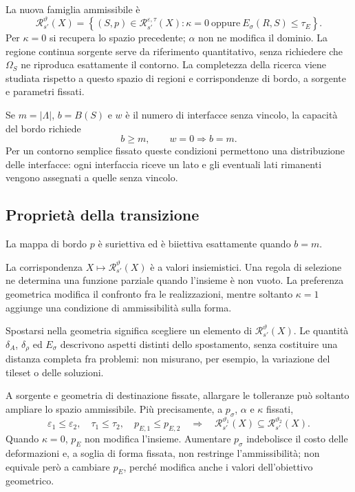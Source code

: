 \documentclass[11pt,a4paper]{article}
\begin{document}
La nuova famiglia ammissibile è
\[
\boxed{\mathcal R_{s'}^{\vartheta}(X)=
\left\{(S,p)\in\mathcal R_{s'}^{\varepsilon,\tau}(X):
\kappa=0\ \text{oppure}\ E_\sigma(R,S)\leq\tau_E\right\}.}
\]
Per $\kappa=0$ si recupera lo spazio precedente; $\alpha$ non ne modifica il dominio. La regione continua sorgente serve da riferimento quantitativo, senza richiedere che $\Omega_S$ ne riproduca esattamente il contorno. La completezza della ricerca viene studiata rispetto a questo spazio di regioni e corrispondenze di bordo, a sorgente e parametri fissati.

Se $m=|\Lambda|$, $b=B(S)$ e $w$ è il numero di interfacce senza vincolo, la capacità del bordo richiede
\[
b\geq m,\qquad w=0\Longrightarrow b=m.
\]
Per un contorno semplice fissato queste condizioni permettono una distribuzione delle interfacce: ogni interfaccia riceve un lato e gli eventuali lati rimanenti vengono assegnati a quelle senza vincolo.

\subsection{Proprietà della transizione}

La mappa di bordo $p$ è suriettiva ed è biiettiva esattamente quando $b=m$.

La corrispondenza $X\mapsto\mathcal R_{s'}^{\vartheta}(X)$ è a valori insiemistici. Una regola di selezione ne determina una funzione parziale quando l'insieme è non vuoto. La preferenza geometrica modifica il confronto fra le realizzazioni, mentre soltanto $\kappa=1$ aggiunge una condizione di ammissibilità sulla forma.

Spostarsi nella geometria significa scegliere un elemento di $\mathcal R_{s'}^{\vartheta}(X)$. Le quantità $\delta_A$, $\delta_\rho$ ed $E_\sigma$ descrivono aspetti distinti dello spostamento, senza costituire una distanza completa fra problemi: non misurano, per esempio, la variazione del tileset o delle soluzioni.

A sorgente e geometria di destinazione fissate, allargare le tolleranze può soltanto ampliare lo spazio ammissibile. Più precisamente, a $p_\sigma$, $\alpha$ e $\kappa$ fissati,
\[
\varepsilon_1\leq\varepsilon_2,\quad \tau_1\leq\tau_2,
\quad p_{E,1}\leq p_{E,2}
\quad\Longrightarrow\quad
\mathcal R_{s'}^{\vartheta_1}(X)
\subseteq\mathcal R_{s'}^{\vartheta_2}(X).
\]
Quando $\kappa=0$, $p_E$ non modifica l'insieme. Aumentare $p_\sigma$ indebolisce il costo delle deformazioni e, a soglia di forma fissata, non restringe l'ammissibilità; non equivale però a cambiare $p_E$, perché modifica anche i valori dell'obiettivo geometrico.
\end{document}
